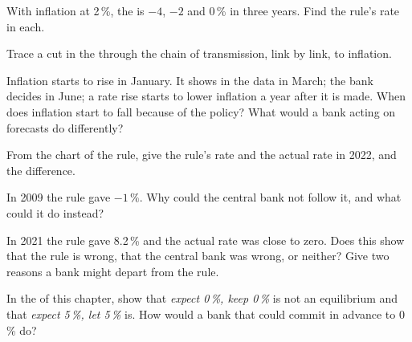\begin{exercise}[$\star\star$]\label{exo:g12:monetary-policy:7}
With inflation at 2\,\%, the  is $-4$, $-2$ and 0\,\% in three years. Find the rule's rate in each.
\end{exercise}

\begin{exercise}[$\star\star$]\label{exo:g12:monetary-policy:8}
Trace a cut in the  through the chain of transmission, link by link, to inflation.
\end{exercise}

\begin{exercise}[$\star\star$]\label{exo:g12:monetary-policy:9}
Inflation starts to rise in January. It shows in the data in March; the bank decides in June; a rate rise starts to lower inflation a year after it is made. When does
inflation start to fall because of the policy? What would a bank acting on forecasts do differently?
\end{exercise}

\begin{exercise}[$\star\star$]\label{exo:g12:monetary-policy:10}
From the chart of the rule, give the rule's rate and the actual rate in 2022, and the difference.
\end{exercise}

\begin{exercise}[$\star\star$]\label{exo:g12:monetary-policy:11}
In 2009 the rule gave $-1\,\%$. Why could the central bank not follow it, and what could it do instead?
\end{exercise}

\begin{exercise}[$\star\star\star$]\label{exo:g12:monetary-policy:12}
In 2021 the rule gave 8.2\,\% and the actual rate was close to zero. Does this show that the rule is wrong, that the central bank was wrong, or neither? Give two reasons a
bank might depart from the rule.
\end{exercise}

\begin{exercise}[$\star\star\star$]\label{exo:g12:monetary-policy:13}
In the  of this chapter, show that \emph{expect 0\,\%, keep 0\,\%} is not an equilibrium and that \emph{expect 5\,\%, let 5\,\%} is. How would a bank that could commit
in advance to 0\,\% do?
\end{exercise}

